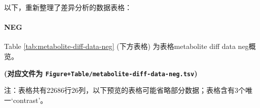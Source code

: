 \documentclass[
]{article}
\begin{document}
以下，重新整理了差异分析的数据表格：

\hypertarget{neg-1}{%
\paragraph{NEG}\label{neg-1}}

Table \ref{tab:metabolite-diff-data-neg} (下方表格) 为表格metabolite diff data neg概览。

\textbf{(对应文件为 \texttt{Figure+Table/metabolite-diff-data-neg.tsv})}

\begin{center}\begin{tcolorbox}[colback=gray!10, colframe=gray!50, width=0.9\linewidth, arc=1mm, boxrule=0.5pt]注：表格共有22686行26列，以下预览的表格可能省略部分数据；表格含有3个唯一`contrast'。
\end{tcolorbox}
\end{center}
\end{document}
